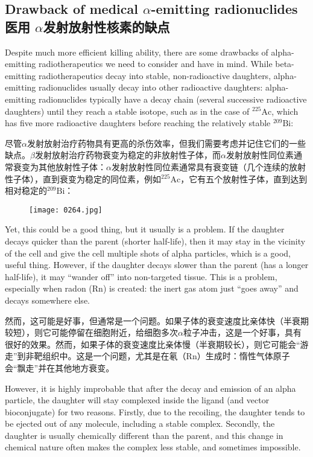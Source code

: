 \documentclass[dvipsnames, svgnames,a4paper,11pt]{article}
\begin{document}
\subsection{Drawback of medical \(\alpha\)-emitting radionuclides \\ 医用
\(\alpha\)发射放射性核素的缺点}  
Despite much more efficient killing ability, there are some drawbacks of alpha-emitting radiotherapeutics we need to consider and have in mind. While beta-emitting radiotherapeutics decay into stable, non-radioactive daughters, alpha-emitting radionuclides usually decay into other radioactive daughters: alpha-emitting radionuclides typically have a decay chain (several successive radioactive daughters) until they reach a stable isotope, such as in the case of \(\mathrm{^{225}Ac}\), which has five more radioactive daughters before reaching the relatively stable \(\mathrm{^{209}Bi}\):

尽管$\alpha$发射放射治疗药物具有更高的杀伤效率，但我们需要考虑并记住它们的一些缺点。$\beta$发射放射治疗药物衰变为稳定的非放射性子体，而$\alpha$发射放射性同位素通常衰变为其他放射性子体：$\alpha$发射放射性同位素通常具有衰变链（几个连续的放射性子体），直到衰变为稳定的同位素，例如\(\mathrm{^{225}Ac}\)，它有五个放射性子体，直到达到相对稳定的\(\mathrm{^{209}Bi}\)：  

\begin{figure}[h]
    \centering
    \texttt{[image: 0264.jpg]}
     \label{fig355}
\end{figure}

Yet, this could be a good thing, but it usually is a problem. If the daughter decays quicker than the parent (shorter half-life), then it may stay in the vicinity of the cell and give the cell multiple shots of alpha particles, which is a good, useful thing. However, if the daughter decays slower than the parent (has a longer half-life), it may “wander off” into non-targeted tissue. This is a problem, especially when radon (\(\mathrm{Rn}\)) is created: the inert gas atom just “goes away” and decays somewhere else.  

然而，这可能是好事，但通常是一个问题。如果子体的衰变速度比亲体快（半衰期较短），则它可能停留在细胞附近，给细胞多次$\alpha$粒子冲击，这是一个好事，具有很好的效果。然而，如果子体的衰变速度比亲体慢（半衰期较长），则它可能会“游走”到非靶组织中。这是一个问题，尤其是在氡（\(\mathrm{Rn}\)）生成时：惰性气体原子会“飘走”并在其他地方衰变。  

However, it is highly improbable that after the decay and emission of an alpha particle, the daughter will stay complexed inside the ligand (and vector bioconjugate) for two reasons. Firstly, due to the recoiling, the daughter tends to be ejected out of any molecule, including a stable complex. Secondly, the daughter is usually chemically different than the parent, and this change in chemical nature often makes the complex less stable, and sometimes impossible.  
\end{document}
